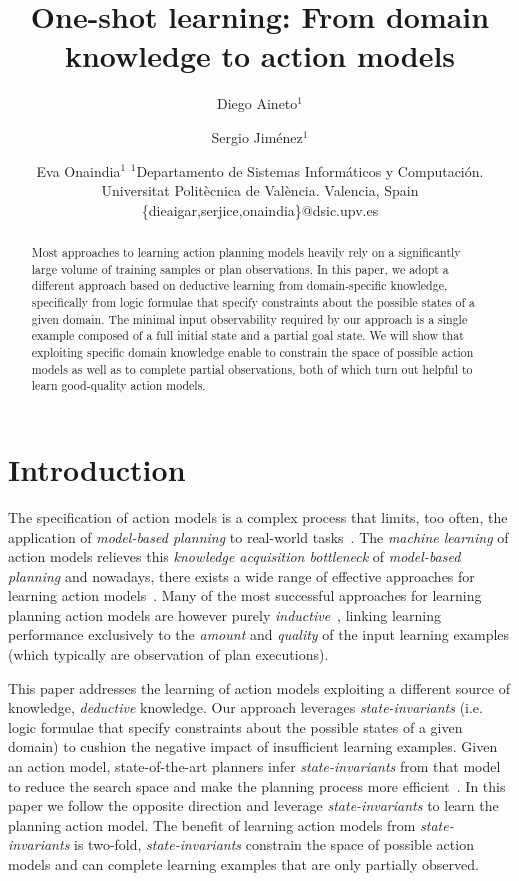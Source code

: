 \documentclass{article}
\title{One-shot learning: From domain knowledge to action models}
\author{
Diego Aineto$^1$\and
Sergio Jim\'enez$^1$\and
Eva Onaindia$^1$
\affiliations
$^1${\small Departamento de Sistemas Inform\'aticos y Computaci\'on. Universitat Polit\`ecnica de Val\`encia. Valencia, Spain}
\emails
{\scriptsize \{dieaigar,serjice,onaindia\}@dsic.upv.es}}
\begin{document}
\maketitle


\begin{abstract}
Most approaches to learning action planning models heavily rely on a significantly large volume of training samples or plan observations. In this paper, we adopt a different approach based on deductive learning from domain-specific knowledge, specifically from logic formulae that specify constraints about the possible states of a given domain. The minimal input observability required by our approach is a single example composed of a full initial state and a partial goal state. We will show that exploiting specific domain knowledge enable to constrain the space of possible action models as well as to complete partial observations, both of which turn out helpful to learn good-quality action models.
 \end{abstract}



\section{Introduction}
\label{sec:introduction}
The specification of action models is a complex process that limits, too often, the application of {\em model-based planning} to real-world tasks~\cite{kambhampati:modellite:AAAI2007}. The {\em machine learning} of action models relieves this {\em knowledge acquisition bottleneck} of {\em model-based planning} and nowadays, there exists a wide range of effective approaches for learning action models~\cite{arora:amodels:ker2018}. Many of the most successful approaches for learning planning action models are however purely {\em inductive}~\cite{yang2007learning,pasula2007learning,mourao2010learning,zhuo2013action}, linking learning performance exclusively to the {\em amount} and {\em quality} of the input learning examples (which typically are observation of plan executions). 

This paper addresses the learning of action models exploiting a different source of knowledge, {\em deductive} knowledge. Our approach leverages {\em state-invariants} (i.e. logic formulae that specify constraints about the possible states of a given domain) to cushion the negative impact of insufficient learning examples. Given an action model, state-of-the-art planners infer {\em state-invariants} from that model to reduce the search space and make the planning process more efficient~\cite{helmert2009concise}. In this paper we follow the opposite direction and leverage {\em state-invariants} to learn the planning action model. The benefit of learning action models from {\em state-invariants} is two-fold, {\em state-invariants} constrain the space of possible action models and can complete learning examples that are only partially observed.
\end{document}
